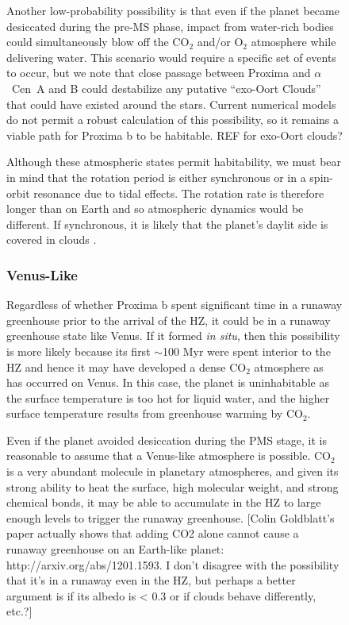 \documentclass[preprint,12pt]{aastex}
\newcommand{\xxx}[1]{{\color{red} #1}} %
\def\acen{{$\alpha$~Cen}}
\begin{document}
\begin{figure}
Another low-probability possibility is that even if the planet became
desiccated during the pre-MS phase, impact from water-rich bodies
could simultaneously blow off the CO$_2$ and/or O$_2$ atmosphere while
delivering water. This scenario would require a specific set of events to occur, but we note
that close passage between Proxima and \acen~A and B could destabilize
any putative ``exo-Oort Clouds'' that could have existed around the
stars. Current numerical models do not permit a robust calculation of
this possibility, so it remains a viable path for Proxima b to be
habitable. \xxx{REF for exo-Oort clouds?}

Although these atmospheric states permit habitability, we must bear in
mind that the rotation period is either synchronous or in a spin-orbit
resonance due to tidal effects. The rotation rate is therefore longer
than on Earth and so atmospheric dynamics would be different. If
synchronous, it is likely that the planet's daylit side is
covered in clouds \citep{Yang13}.

\subsubsection{Venus-Like}
\label{sec:results:atmstates:venuslike}


Regardless of whether Proxima b spent significant time in a runaway
greenhouse prior to the arrival of the HZ, it could be in a runaway
greenhouse state like Venus. If it formed {\it in situ}, then this
possibility is more likely because its first $\sim$100 Myr were spent
interior to the HZ and hence it may have developed a dense CO$_2$
atmosphere as has occurred on Venus. In this case, the planet is
uninhabitable as the surface temperature is too hot for liquid water,
and the higher surface temperature results from greenhouse warming by
CO$_2$.

Even if the planet avoided desiccation during the PMS stage, it is
reasonable to assume that a Venus-like atmosphere is possible. CO$_2$
is a very abundant molecule in planetary atmospheres, and given its
strong ability to heat the surface, high molecular weight, and strong
chemical bonds, it may be able to accumulate in the HZ to large enough
levels to trigger the runaway greenhouse. \xxx{[Colin Goldblatt's
paper actually shows that adding CO2 alone cannot cause a runaway
greenhouse on an Earth-like planet: http://arxiv.org/abs/1201.1593.
I don't disagree with the possibility that it's in a runaway even in 
the HZ, but perhaps a better argument is if its albedo is < 0.3 or if
clouds behave differently, etc.?]}


\end{figure}
\end{document}
